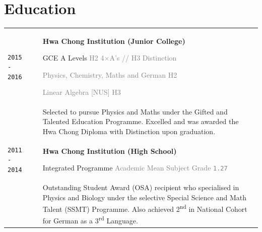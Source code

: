 \documentclass[11pt]{article}
\begin{document}
\vspace{1.5cm}

\section{\textcolor{section_1}{Education}}
\vspace{-\baselineskip}
{
	\renewcommand{\arraystretch}{2}
	\begin{tabularx}{\textwidth}{@{}l p{0.3cm} X@{}}
		\texttt{\large 2015 - 2016} & & \textbf{Hwa Chong Institution (Junior College)}\par GCE A Levels \hfill \textcolor{gray}{H2 4$\times$A's // H3 Distinction}\par \hfill \textcolor{gray}{{\scriptsize Physics, Chemistry, Maths and German} \hspace{1em} H2}\par \hfill \textcolor{gray}{{\scriptsize Linear Algebra [NUS]} \hspace{1em} H3} \\[-0.5em]
		&& {\small Selected to pursue Physics and Maths under the Gifted and Talented Education Programme. Excelled and was awarded the Hwa Chong Diploma with Distinction upon graduation.} \\
		\texttt{\large 2011 - 2014} & & \textbf{Hwa Chong Institution (High School)} \par Integrated Programme \hfill \textcolor{gray}{{\scriptsize Academic Mean Subject Grade} \texttt{\large 1.27}} \\[-0.5em]
		&& {\small Outstanding Student Award {\footnotesize (OSA)} recipient who specialised in Physics and Biology under the selective Special Science and Math Talent {\footnotesize (SSMT)} Programme. Also achieved 2\textsuperscript{nd} in National Cohort for German as a 3\textsuperscript{rd} Language.} %
	\end{tabularx}
}
\end{document}
